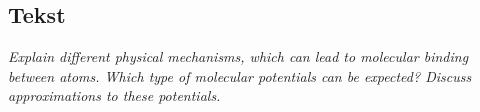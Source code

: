 \subsection{Tekst}

\emph{Explain different physical mechanisms, which can lead to molecular binding between atoms. Which type of molecular potentials can be expected? Discuss approximations to these potentials.}